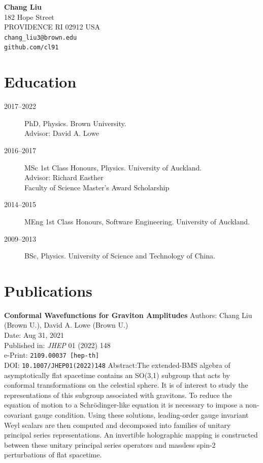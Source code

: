 \documentclass{brownthesis}
\begin{document}
   \begin{flushright}
{\large\bf Chang Liu}\\\vskip6pt
182 Hope Street\\
PROVIDENCE RI 02912 USA\\\vskip2pt
{\tt chang\_liu3@brown.edu}\\
{\tt github.com/cl91}
\end{flushright}

\section*{Education}
\begin{description}
\item[2017--2022] PhD, Physics. Brown University.\\
  Advisor: David A. Lowe
\item[2016--2017] MSc 1st Class Honours, Physics. University of Auckland.\\
  Advisor: Richard Easther\\
  Faculty of Science Master's Award Scholarship
\item[2014--2015] MEng 1st Class Honours, Software Engineering. University of Auckland.
\item[2009--2013] BSc, Physics. University of Science and Technology of China.
\end{description}

\section*{Publications}
{\bf Conformal Wavefunctions for Graviton Amplitudes}
\medbreak
\noindent Authors: Chang Liu (Brown U.), David A. Lowe (Brown U.)\\
Date: Aug 31, 2021\\
Published in: {\sl JHEP} 01 (2022) 148\\
e-Print: {\tt 2109.00037 [hep-th]}\\
DOI: {\tt 10.1007/JHEP01(2022)148}
\medbreak
\noindent Abstract:\quad The extended-BMS algebra of asymptotically flat spacetime contains an SO(3,1) subgroup that acts by conformal transformations on the celestial sphere. It is of interest to study the representations of this subgroup associated with gravitons. To reduce the equation of motion to a Schr\"odinger-like equation it is necessary to impose a non-covariant gauge condition. Using these solutions, leading-order gauge invariant Weyl scalars are then computed and decomposed into families of unitary principal series representations. An invertible holographic mapping is constructed between these unitary principal series operators and massless spin-2 perturbations of flat spacetime.
\bigbreak
\end{document}
